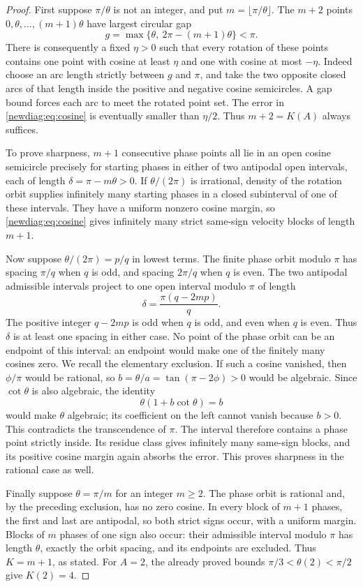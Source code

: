 \documentclass[11pt,a4paper]{article}
\numberwithin{equation}{section}
\theoremstyle{definition}
\theoremstyle{remark}
\begin{document}
\begin{proof}
First suppose $\pi/\theta$ is not an integer, and put
$m=\lfloor\pi/\theta\rfloor$.  The $m+2$ points
$0,\theta,\ldots,(m+1)\theta$ have largest circular gap
\[
 g=\max\{\theta,\ 2\pi-(m+1)\theta\}<\pi.
\]
There is consequently a fixed $\eta>0$ such that every rotation of
these points contains one point with cosine at least $\eta$ and one
with cosine at most $-\eta$.  Indeed choose an arc length strictly
between $g$ and $\pi$, and take the two opposite closed arcs of that
length inside the positive and negative cosine semicircles.  A gap
bound forces each arc to meet the rotated point set.  The error in
\eqref{newdiag:eq:cosine} is eventually smaller than $\eta/2$.
Thus $m+2=K(A)$ always suffices.

To prove sharpness, $m+1$ consecutive phase points all lie in an open
cosine semicircle precisely for starting phases in either of two
antipodal open intervals, each of length
$\delta=\pi-m\theta>0$.  If $\theta/(2\pi)$ is irrational, density
of the rotation orbit supplies infinitely many starting phases in a
closed subinterval of one of these intervals.  They have a uniform
nonzero cosine margin, so \eqref{newdiag:eq:cosine} gives infinitely
many strict same-sign velocity blocks of length $m+1$.

Now suppose $\theta/(2\pi)=p/q$ in lowest terms.  The finite phase
orbit modulo $\pi$ has spacing $\pi/q$ when $q$ is odd, and spacing
$2\pi/q$ when $q$ is even.  The two antipodal admissible intervals
project to one open interval modulo $\pi$ of length
\[
 \delta=\frac{\pi(q-2mp)}q.
\]
The positive integer $q-2mp$ is odd when $q$ is odd, and even when
$q$ is even.  Thus $\delta$ is at least one spacing in either case.
No point of the phase orbit can be an endpoint of this interval:
an endpoint would make one of the finitely many cosines zero.  We
recall the elementary exclusion.  If such a cosine vanished, then
$\phi/\pi$ would be rational, so
$b=\theta/a=\tan(\pi-2\phi)>0$ would be algebraic.  Since
$\cot\theta$ is also algebraic, the identity
\[
 \theta(1+b\cot\theta)=b
\]
would make $\theta$ algebraic; its coefficient on the left cannot
vanish because $b>0$.  This contradicts the transcendence of $\pi$.
The interval therefore contains a phase point strictly inside.
Its residue class gives infinitely many same-sign blocks, and its
positive cosine margin again absorbs the error.  This proves
sharpness in the rational case as well.

Finally suppose $\theta=\pi/m$ for an integer $m\geq2$.
The phase orbit is rational and, by the preceding exclusion, has no
zero cosine.  In every block of $m+1$ phases, the first and last
are antipodal, so both strict signs occur, with a uniform margin.
Blocks of $m$ phases of one sign also occur: their admissible interval
modulo $\pi$ has length $\theta$, exactly the orbit spacing, and
its endpoints are excluded.  Thus $K=m+1$, as stated.
For $A=2$, the already proved bounds $\pi/3<\theta(2)<\pi/2$
give $K(2)=4$.
\end{proof}
\end{document}
